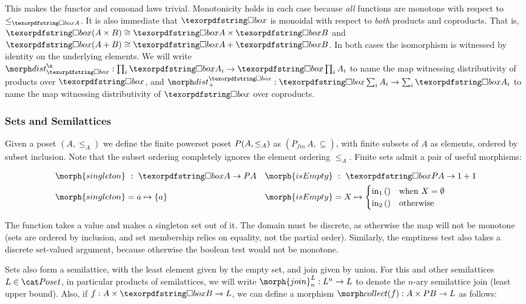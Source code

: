 \noindent
This makes the functor and comonad laws trivial. Monotonicity holds in each case because \emph{all} functions are monotone with respect to $\le_{\iso A}$.
%
It is also immediate that $\iso$ is monoidal with respect to \emph{both}
products and coproducts. That is, $\iso (A \times B) \cong \iso A \times \iso B$
and $\iso (A + B) \cong \iso A + \iso B$.
%
In both cases the isomorphism is witnessed by identity on the underlying
elements.
%
We will write $\isox : \prod_i \iso A_i \to \iso\prod_i A_i$ to name the map
witnessing distributivity of products over $\iso$, and $\isosum : \iso \sum_i
A_i \to \sum_i \iso A_i$ to name the map witnessing distributivity of $\iso$
over coproducts.


\subsubsection{Sets and Semilattices}

Given a poset $(A, \leq_A)$ we define the finite powerset poset $P (A,
\leq_A)$ as $(P_{\textit{fin}}\, A, \subseteq)$, with finite subsets of $A$ as
elements, ordered by subset inclusion.
%
Note that the subset ordering completely ignores the element ordering $\leq_A$.
%
Finite sets admit a pair of useful morphisms:

\begin{align*}
  \morph{singleton} &\isa \iso A \to \pfinof A
  &
  \morph{isEmpty} &\isa \iso \pfinof A \to \termO + \termO
  \\
  \morph{singleton} &= a \mapsto \{a\}
  &
  \morph{isEmpty} &= X \mapsto 
  \begin{cases}
    \inj 1 () &\text{when }X = \emptyset\\
    \inj 2 () &\text{otherwise}
  \end{cases}
\end{align*}

\noindent
The  function takes a value and makes a singleton set out of
it. The domain must be discrete, as otherwise the map will not be monotone (sets
are ordered by inclusion, and set membership relies on equality, not the partial
order). Similarly, the emptiness test  also takes a discrete
set-valued argument, because otherwise the boolean test would not be monotone.

Sets also form a semilattice, with the least element given by the empty set, and
join given by union.
%
For this and other semilattices $L \in \Poset$, in particular products of
semilattices, we will write $\morph{join}^L_n : L^n \to L$ to denote the $n$-ary
semilattice join (least upper bound).
%
Also, if $f : A \times \iso B \to L$, we can define a morphism
$\pcollect{f} : A \times \pfinof{B} \to L$ as follows:

